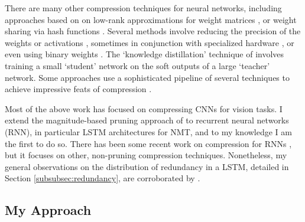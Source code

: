 \begin{sloppypar}
There are many other compression techniques for neural networks, including approaches based on on low-rank approximations for weight matrices \cite{jaderberg2014speeding,denton2014exploiting}, or weight sharing  via hash functions \cite{chen2015compressing}.
Several methods involve reducing the precision of the weights or activations \cite{courbariaux2015low}, sometimes in conjunction with specialized hardware \cite{gupta2015deep}, or even using binary weights \cite{lin2015neural}.
The `knowledge distillation' technique of \cite{hinton2015distilling} involves training a small `student' network on the soft outputs of a large `teacher' network.
Some approaches use a sophisticated pipeline of several techniques to achieve impressive feats of compression \cite{han2015deep,iandola2016squeezenet}.
\end{sloppypar}

Most of the above work has focused on compressing CNNs for vision tasks. 
I extend the magnitude-based pruning approach of \cite{han2015learning} to recurrent neural networks (RNN), in particular LSTM architectures for NMT, and to my knowledge I am the first to do so.
There has been some recent work on compression for RNNs \cite{lu2016learning,prabhavalkar2016compression}, but it focuses on other, non-pruning compression techniques. 
Nonetheless, my general observations on the distribution of redundancy in a
LSTM, detailed in Section \ref{subsubsec:redundancy}, are corroborated by \cite{lu2016learning}.

\subsection{My Approach}
\label{subsec:approach}
